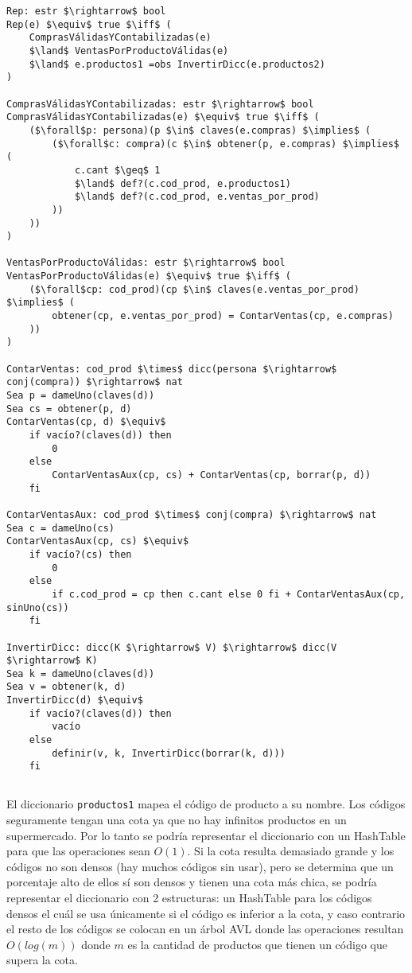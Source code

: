 \begin{lstlisting}
Rep: estr $\rightarrow$ bool
Rep(e) $\equiv$ true $\iff$ (
    ComprasVálidasYContabilizadas(e)
    $\land$ VentasPorProductoVálidas(e)
    $\land$ e.productos1 =obs InvertirDicc(e.productos2)
)

ComprasVálidasYContabilizadas: estr $\rightarrow$ bool
ComprasVálidasYContabilizadas(e) $\equiv$ true $\iff$ (
    ($\forall$p: persona)(p $\in$ claves(e.compras) $\implies$ (
        ($\forall$c: compra)(c $\in$ obtener(p, e.compras) $\implies$ (
            c.cant $\geq$ 1
            $\land$ def?(c.cod_prod, e.productos1)
            $\land$ def?(c.cod_prod, e.ventas_por_prod)
        ))
    ))
)

VentasPorProductoVálidas: estr $\rightarrow$ bool
VentasPorProductoVálidas(e) $\equiv$ true $\iff$ (
    ($\forall$cp: cod_prod)(cp $\in$ claves(e.ventas_por_prod) $\implies$ (
        obtener(cp, e.ventas_por_prod) = ContarVentas(cp, e.compras)
    ))
)

ContarVentas: cod_prod $\times$ dicc(persona $\rightarrow$ conj(compra)) $\rightarrow$ nat
Sea p = dameUno(claves(d))
Sea cs = obtener(p, d)
ContarVentas(cp, d) $\equiv$
    if vacío?(claves(d)) then
        0
    else
        ContarVentasAux(cp, cs) + ContarVentas(cp, borrar(p, d))
    fi

ContarVentasAux: cod_prod $\times$ conj(compra) $\rightarrow$ nat
Sea c = dameUno(cs)
ContarVentasAux(cp, cs) $\equiv$
    if vacío?(cs) then
        0
    else
        if c.cod_prod = cp then c.cant else 0 fi + ContarVentasAux(cp, sinUno(cs))
    fi

InvertirDicc: dicc(K $\rightarrow$ V) $\rightarrow$ dicc(V $\rightarrow$ K)
Sea k = dameUno(claves(d))
Sea v = obtener(k, d)
InvertirDicc(d) $\equiv$
    if vacío?(claves(d)) then
        vacío
    else
        definir(v, k, InvertirDicc(borrar(k, d)))
    fi
\end{lstlisting}

\subsection{}

El diccionario \lstinline{productos1} mapea el código de producto a su nombre. Los códigos seguramente tengan una cota ya que no hay infinitos productos en un supermercado. Por lo tanto se podría representar el diccionario con un HashTable para que las operaciones sean $O(1)$. Si la cota resulta demasiado grande y los códigos no son densos (hay muchos códigos sin usar), pero se determina que un porcentaje alto de ellos sí son densos y tienen una cota más chica, se podría representar el diccionario con 2 estructuras: un HashTable para los códigos densos el cuál se usa únicamente si el código es inferior a la cota, y caso contrario el resto de los códigos se colocan en un árbol AVL donde las operaciones resultan $O(log(m))$ donde $m$ es la cantidad de productos que tienen un código que supera la cota.

